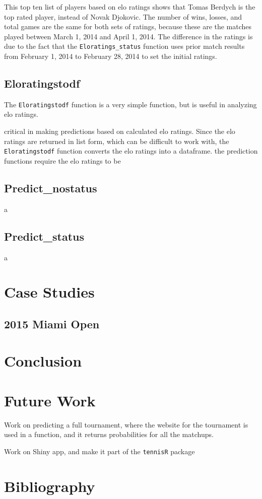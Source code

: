 \documentclass{article}\usepackage[]{graphicx}\usepackage[]{color}
\numberwithin{equation}{section} %
\newcommand{\pkg}[1]{{\texttt{#1}}}
\begin{document}
This top ten list of players based on elo ratings shows that Tomas Berdych is the top rated player, instead of Novak Djokovic.  The number of wins, losses, and total games are the same for both sets of ratings, because these are the matches played between March 1, 2014 and April 1, 2014.  The difference in the ratings is due to the fact that the \texttt{Eloratings\_status} function uses prior match results from February 1, 2014 to February 28, 2014 to set the initial ratings.

\subsection{Eloratingstodf}

The \texttt{Eloratingstodf} function is a very simple function, but is useful in analyzing elo ratings.  

critical in making predictions based on calculated elo ratings.  Since the elo ratings are returned in list form, which can be difficult to work with, the \texttt{Eloratingstodf} function converts the elo ratings into a dataframe.   the prediction functions require the elo ratings to be 

\subsection{Predict\_nostatus}

a

\subsection{Predict\_status}

a

\section{Case Studies}

\subsection{2015 Miami Open}



\section{Conclusion}

\section{Future Work}

Work on predicting a full tournament, where the website for the tournament is used in a function, and it returns probabilities for all the matchups.

Work on Shiny app, and make it part of the \pkg{tennisR} package

\section{Bibliography}
\end{document}
